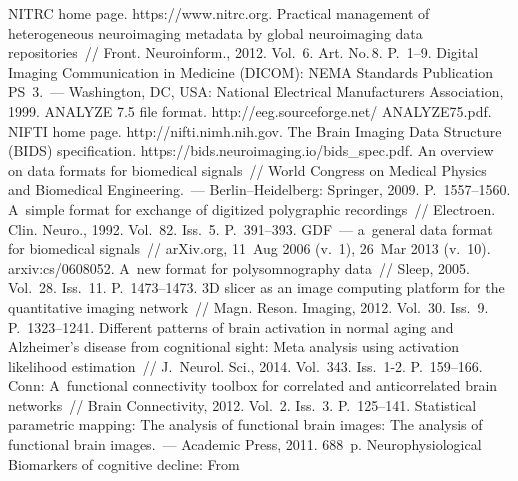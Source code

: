 \begin{multicols}{2}
{{\begin{thebibliography}{99}
  NITRC home page. {\sf https://www.nitrc.org}.
   Practical management of 
heterogeneous neuroimaging metadata by global neuroimaging data repositories~// 
Front. Neuroinform., 2012. Vol.~6. Art. No.\,8. P.~1--9.
  Digital Imaging Communication in Medicine (DICOM): NEMA Standards 
Publication PS~3.~--- Washington, DC, USA: National Electrical Manufacturers 
Association, 1999.
  ANALYZE 7.5 file format. {\sf http://eeg.sourceforge.net/ ANALYZE75.pdf}.
  NIFTI home page. {\sf http://nifti.nimh.nih.gov}.
  The Brain Imaging Data Structure (BIDS) specification. {\sf 
https://bids.neuroimaging.io/bids\_spec.pdf}.
   An overview on data formats for biomedical 
signals~// World Congress on Medical Physics and Biomedical Engineering.~--- 
Berlin--Heidelberg: Springer, 2009. P.~1557--1560.
   A~simple format for exchange of digitized polygraphic recordings~// 
Electroen. Clin. Neuro., 1992. Vol.~82. Iss.~5. 
P.~391--393.
   GDF~--- a~general data format for 
biomedical signals~// arXiv.org, 11~Aug 2006 (v.~1), 26~Mar 2013 (v.~10). 
arxiv:cs/0608052.
   A~new format for 
polysomnography data~// Sleep, 2005. Vol.~28. Iss.~11. P.~1473--1473.
   3D slicer as 
an image computing platform for the quantitative imaging network~// Magn. 
Reson. Imaging, 2012. Vol.~30. Iss.~9. P.~1323--1241.
Different patterns of brain activation in normal aging and Alzheimer's disease from 
cognitional sight: Meta analysis using activation likelihood estimation~// 
J.~Neurol. Sci., 2014. Vol.~343. Iss.~1-2. P.~159--166. 
   Conn: A~functional 
connectivity toolbox for correlated and anticorrelated brain networks~// Brain 
Connectivity, 2012. Vol.~2. Iss.~3. P.~125--141. 
   Statistical parametric mapping: The analysis of functional brain 
images: The analysis of functional brain images.~--- Academic Press, 2011. 688~p.
   Neurophysiological Biomarkers of cognitive decline: From 

\end{thebibliography}}}
\end{multicols}
